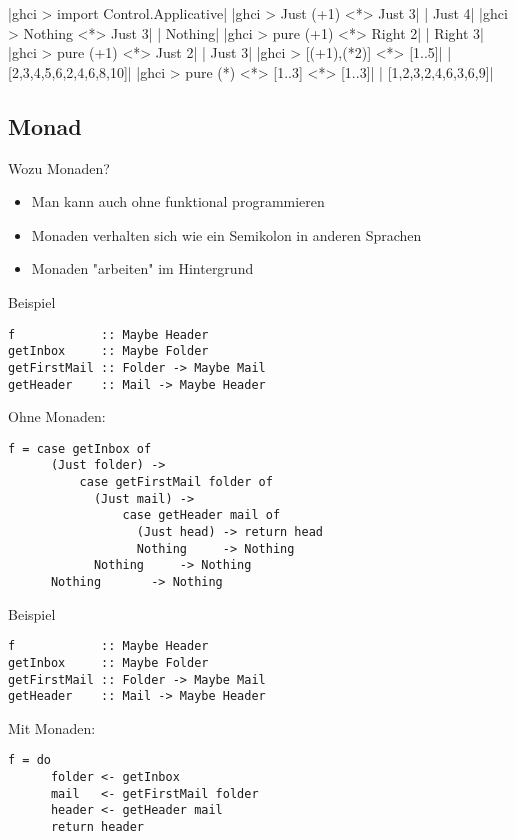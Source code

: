 \documentclass{beamer}
\begin{document}
\begin{frame}[fragile]
|ghci > import Control.Applicative|
|ghci > Just (+1) <*> Just 3|
\pause
{}|       Just 4|
|ghci > Nothing <*> Just 3|
\pause
{}|       Nothing|
|ghci > pure (+1) <*> Right 2|
\pause
{}|       Right 3|
|ghci > pure (+1) <*> Just 2|
\pause
{}|       Just 3|
|ghci > [(+1),(*2)] <*> [1..5]|
\pause
{}|       [2,3,4,5,6,2,4,6,8,10]|
|ghci > pure (*) <*> [1..3] <*> [1..3]|
\pause
{}|       [1,2,3,2,4,6,3,6,9]|
\end{frame}


\subsection{Monad}
\begin{frame}
Wozu Monaden?
\pause
\begin{itemize}
 \item Man kann auch ohne funktional programmieren
 \pause
 \item Monaden verhalten sich wie ein Semikolon in anderen Sprachen
 \pause
 \item Monaden "arbeiten" im Hintergrund
\end{itemize}

\end{frame}

\begin{frame}[fragile]
Beispiel
\begin{verbatim}
f            :: Maybe Header
getInbox     :: Maybe Folder
getFirstMail :: Folder -> Maybe Mail
getHeader    :: Mail -> Maybe Header
\end{verbatim}
\pause
Ohne Monaden:
\begin{verbatim}
f = case getInbox of
      (Just folder) -> 
          case getFirstMail folder of
            (Just mail) -> 
                case getHeader mail of
                  (Just head) -> return head
                  Nothing     -> Nothing
            Nothing     -> Nothing
      Nothing       -> Nothing
\end{verbatim}
\end{frame}
\begin{frame}[fragile]
Beispiel
\begin{verbatim}
f            :: Maybe Header
getInbox     :: Maybe Folder
getFirstMail :: Folder -> Maybe Mail
getHeader    :: Mail -> Maybe Header
\end{verbatim}
Mit Monaden:
\begin{verbatim}
f = do
      folder <- getInbox
      mail   <- getFirstMail folder
      header <- getHeader mail
      return header
\end{verbatim}

\end{frame}
\end{document}
